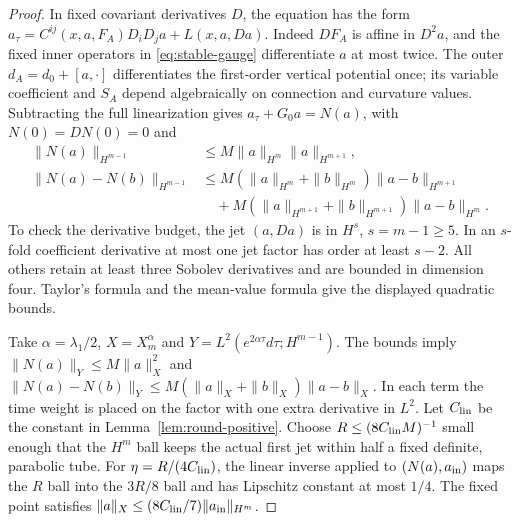 \documentclass[11pt]{article}
\numberwithin{equation}{section}
\theoremstyle{definition}
\theoremstyle{remark}
\begin{document}
\begin{proof}
In fixed covariant derivatives $D$, the equation has the form
$a_\tau=C^{ij}(x,a,F_A)D_iD_ja+L(x,a,Da)$.
Indeed $DF_A$ is affine in $D^2a$, and the fixed inner
operators in \eqref{eq:stable-gauge} differentiate $a$ at
most twice. The outer $d_A=d_0+[a,\cdot]$ differentiates
the first-order vertical potential once; its variable
coefficient and $S_A$ depend algebraically on connection
and curvature values. Subtracting the full linearization
gives $a_\tau+G_0a=N(a)$, with $N(0)=DN(0)=0$ and
\begin{align*}
 \|N(a)\|_{H^{m-1}}
 &\le M\|a\|_{H^m}\|a\|_{H^{m+1}},\\
 \|N(a)-N(b)\|_{H^{m-1}}
 &\le M(\|a\|_{H^m}+\|b\|_{H^m})\|a-b\|_{H^{m+1}}\\
 &\quad+M(\|a\|_{H^{m+1}}+\|b\|_{H^{m+1}})
                                      \|a-b\|_{H^m}.
\end{align*}
To check the derivative budget, the jet $(a,Da)$ is in
$H^s$, $s=m-1\ge5$. In an $s$-fold coefficient derivative
at most one jet factor has order at least $s-2$.
All others retain at least three Sobolev derivatives and
are bounded in dimension four. Taylor's formula and the
mean-value formula give the displayed quadratic bounds.

Take $\alpha=\lambda_1/2$, $X=X_m^\alpha$ and
$Y=L^2(e^{2\alpha\tau}d\tau;H^{m-1})$.
The bounds imply
$\|N(a)\|_Y\le M\|a\|_X^2$ and
$\|N(a)-N(b)\|_Y\le
M(\|a\|_X+\|b\|_X)\|a-b\|_X$.
In each term the time weight is placed on the factor
with one extra derivative in $L^2$.
Let $C_{\rm lin}$ be the constant in
Lemma~\ref{lem:round-positive}.
Choose $R\le(8C_{\rm lin}M)^{-1}$ small enough that
the $H^m$ ball keeps the actual first jet within half a
fixed definite, parabolic tube. For
$\eta=R/(4C_{\rm lin})$, the linear inverse applied to
$(N(a),a_{\rm in})$ maps the $R$ ball into the $3R/8$
ball and has Lipschitz constant at most $1/4$.
The fixed point satisfies
$\|a\|_X\le(8C_{\rm lin}/7)\|a_{\rm in}\|_{H^m}$.


\end{proof}
\end{document}
